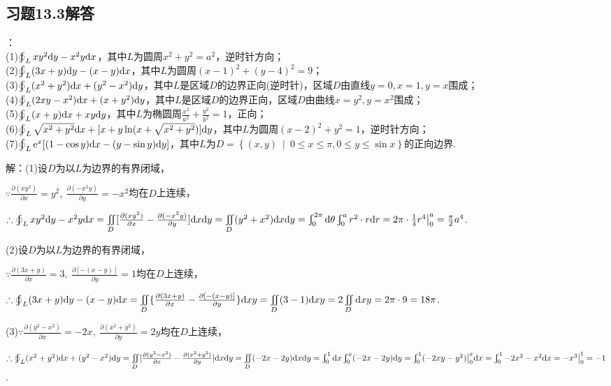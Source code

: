 \documentclass[12pt,UTF8]{ctexart}
\newcommand\Set[2]{\left\{#1\ \middle\vert\ #2 \right\}}
\newcommand{\Int}[4]{\varint\nolimits_{#1}^{#2}#3\mathrm d#4}
\newcommand{\IInt}[3]{\iint\limits_{#1}#2\mathrm d#3}
\newcommand{\varIInt}[4]{\iint\limits_{#1}#2\mathrm d#3\mathrm d#4}
\newcommand{\BLOInt}[2]{\varoint\nolimits_{#1}#2}
\newcommand{\md}[1]{\mathrm d#1}
\begin{document}
\subsection{习题13.3解答}
\begin{enumerate}
：\\
(1)$\BLOInt L{xy^2\md y-x^2y\md x}$，其中$L$为圆周$x^2+y^2=a^2$，逆时针方向；\\
(2)$\BLOInt L{(3x+y)\md y-(x-y)\md x}$，其中$L$为圆周$(x-1)^2+(y-4)^2=9$；\\
(3)$\BLOInt L{(x^2+y^2)\md x+(y^2-x^2)\md y}$，其中$L$是区域$D$的边界正向(逆时针)，区域$D$由直线$y=0,x=1,y=x$围成；\\
(4)$\BLOInt L{(2xy-x^2)\md x+(x+y^2)\md y}$，其中$L$是区域$D$的边界正向，区域$D$由曲线$x=y^2,y=x^2$围成；\\
(5)$\BLOInt L{(x+y)\md x+xy\md y}$，其中$L$为椭圆周$\frac{x^2}{a^2}+\frac{y^2}{b^2}=1$，正向；\\
(6)$\BLOInt L{\sqrt{x^2+y^2}\md x+[x+y\ln(x+\sqrt{x^2+y^2})]\md y}$，其中$L$为圆周$(x-2)^2+y^2=1$，逆时针方向；\\
(7)$\BLOInt L{\mathrm e^x[(1-\cos y)\md x-(y-\sin y)\md y]}$，其中$L$为$D=\Set{(x,y)}{0\leqslant x\leqslant\pi,0\leqslant y\leqslant\sin x}$的正向边界.

解：(1)设$D$为以$L$为边界的有界闭域，

$\because\frac{\partial(xy^2)}{\partial x}=y^2,\ \frac{\partial(-x^2y)}{\partial y}=-x^2$均在$D$上连续，

$\therefore\BLOInt L{xy^2\md y-x^2y\md x}=\varIInt D{[\frac{\partial(xy^2)}{\partial x}-\frac{\partial(-x^2y)}{\partial y}]}xy=\varIInt D{(y^2+x^2)}xy=\Int0{2\pi}{}\theta\Int0a{r^2\cdot r}r\\
=2\pi\cdot\frac14r^4\big|_0^a=\frac\pi2a^4$.

(2)设$D$为以$L$为边界的有界闭域，

$\because\frac{\partial(3x+y)}{\partial x}=3,\ \frac{\partial[-(x-y)]}{\partial y}=1$均在$D$上连续，

$\therefore\BLOInt L{(3x+y)\md y-(x-y)\md x}=\IInt D{\{\frac{\partial(3x+y)}{\partial x}-\frac{\partial[-(x-y)]}{\partial y}\}}xy=\IInt D{(3-1)}xy=2\IInt D{}xy\\
=2\pi\cdot9=18\pi$.

(3)$\because\frac{\partial(y^2-x^2)}{\partial x}=-2x,\ \frac{\partial(x^2+y^2)}{\partial y}=2y$均在$D$上连续，

$\therefore\BLOInt L{(x^2+y^2)\md x+(y^2-x^2)\md y}=\varIInt D{[\frac{\partial(y^2-x^2)}{\partial x}-\frac{\partial(x^2+y^2)}{\partial y}]}xy=\varIInt D{(-2x-2y)}xy\\
=\Int01{}x\Int0x{(-2x-2y)}y=\Int01{(-2xy-y^2)\big|_0^x}x=\Int01{-2x^2-x^2}x=-x^3\big|_0^1=-1$.


\end{enumerate}
\end{document}
